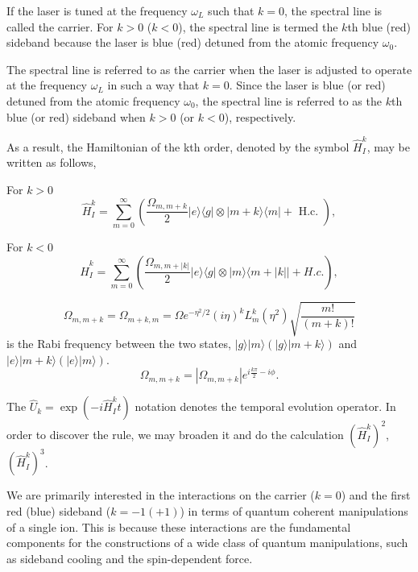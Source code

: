 If the laser is tuned at the frequency $\omega_L$ such that $k=0$, the spectral line is called the carrier. For $k>0$ ($k<0$), the spectral line is termed the $k$th blue (red) sideband because the laser is blue (red) detuned from the atomic frequency $\omega_0$.

The spectral line is referred to as the carrier when the laser is adjusted to operate at the frequency $\omega_L$ in such a way that $k=0$. Since the laser is blue (or red) detuned from the atomic frequency $\omega_0$, the spectral line is referred to as the $k$th blue (or red) sideband when $k>0$ (or $k<0$), respectively.

As a result, the Hamiltonian of the kth order, denoted by the symbol $\hat{H}_I^k$, may be written as follows,

For $k>0$
\begin{equation}
    \hat{H}_I^k=\sum_{m=0}^{\infty}\left(\frac{\Omega_{m, m+k}}{2}|e\rangle\langle g|\otimes| m+k\rangle\langle m|+\text { H.c. }\right),
\end{equation}

For $k<0$
\begin{equation}
    \hat{H}_I^k=\sum_{m=0}^{\infty}\left(\frac{\Omega_{m, m+|k|}}{2}|e\rangle\langle g|\otimes| m\rangle\langle m+|k||+H . c .\right),
\end{equation}

\begin{equation}
    \Omega_{m,m+k}=\Omega_{m+k,m}=\Omega e^{-\eta^2/2}(i\eta)^{k}L_m^{k}(\eta^2)\sqrt{\frac{m!}{(m+k)!}}
\end{equation}
is the Rabi frequency between the two states, $|g\rangle|m\rangle(|g\rangle|m+k\rangle)$ and $|e\rangle|m+k\rangle(|e\rangle|m\rangle)$.
\begin{equation}
    \Omega_{m, m+k}=\left|\Omega_{m, m+k}\right| e^{i \frac{k \pi}{2}-i \phi}.
\end{equation}

The $\hat{U}_{k}=\exp(-i\hat{H}_I^k t)$ notation denotes the temporal evolution operator. In order to discover the rule, we may broaden it and do the calculation $(\hat{H}_I^k)^2$, $(\hat{H}_I^k)^3$.

We are primarily interested in the interactions on the carrier ($k = 0$) and the first red (blue) sideband ($k=-1(+1)$) in terms of quantum coherent manipulations of a single ion. This is because these interactions are the fundamental components for the constructions of a wide class of quantum manipulations, such as sideband cooling and the spin-dependent force.

